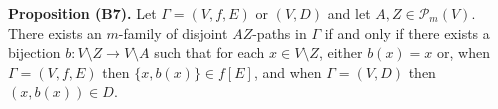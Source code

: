 \textbf{Proposition (B7).} Let $\Gamma = (V, f, E)$ or $(V, D)$ and let $A, Z \in \mathcal{P}_m(V)$. There exists an $m$-family of disjoint $AZ$-paths in $\Gamma$ if and only if there exists a bijection $b: V \setminus Z \to V \setminus A$ such that for each $x \in V \setminus Z$, either $b(x) = x$ or, when $\Gamma = (V, f, E)$ then $\{x, b(x)\} \in f[E]$, and when $\Gamma = (V, D)$ then $(x, b(x)) \in D$.
